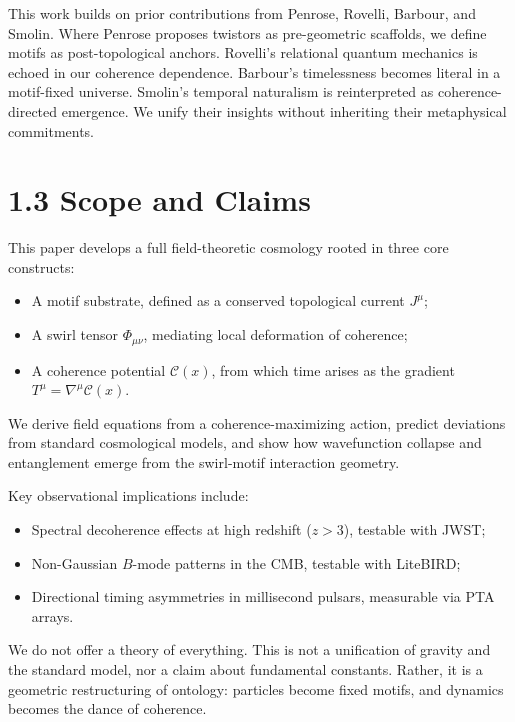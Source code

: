 \documentclass[
  11pt,
]{article}
\providecommand{\tightlist}{%
  \setlength{\itemsep}{0pt}\setlength{\parskip}{0pt}}
\begin{document}
This work builds on prior contributions from Penrose, Rovelli, Barbour,
and Smolin. Where Penrose proposes twistors as pre-geometric scaffolds,
we define motifs as post-topological anchors. Rovelli's relational
quantum mechanics is echoed in our coherence dependence. Barbour's
timelessness becomes literal in a motif-fixed universe. Smolin's
temporal naturalism is reinterpreted as coherence-directed emergence. We
unify their insights without inheriting their metaphysical commitments.

\section{1.3 Scope and Claims}\label{scope-and-claims}

This paper develops a full field-theoretic cosmology rooted in three
core constructs:

\begin{itemize}
\tightlist
\item
  A motif substrate, defined as a conserved topological current
  \(J^\mu\);
\item
  A swirl tensor \(\Phi_{\mu\nu}\), mediating local deformation of
  coherence;
\item
  A coherence potential \(\mathcal{C}(x)\), from which time arises as
  the gradient \(T^\mu = \nabla^\mu \mathcal{C}(x)\).
\end{itemize}

We derive field equations from a coherence-maximizing action, predict
deviations from standard cosmological models, and show how wavefunction
collapse and entanglement emerge from the swirl-motif interaction
geometry.

Key observational implications include:

\begin{itemize}
\tightlist
\item
  Spectral decoherence effects at high redshift (\(z > 3\)), testable
  with JWST;
\item
  Non-Gaussian \(B\)-mode patterns in the CMB, testable with LiteBIRD;
\item
  Directional timing asymmetries in millisecond pulsars, measurable via
  PTA arrays.
\end{itemize}

We do not offer a theory of everything. This is not a unification of
gravity and the standard model, nor a claim about fundamental constants.
Rather, it is a geometric restructuring of ontology: particles become
fixed motifs, and dynamics becomes the dance of coherence.
\end{document}
